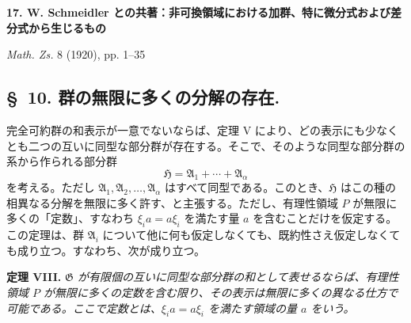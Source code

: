 
\begin{center}
{\Large\bfseries 17. W. Schmeidler との共著：非可換領域における加群、特に微分式および差分式から生じるもの}\par
\vspace{1em}
\emph{Math. Zs.} 8 (1920), pp. 1--35
\end{center}


\setcounter{footnote}{19}
\subsection*{\S~10. 群の無限に多くの分解の存在.}

完全可約群の和表示が一意でないならば、定理 V により、どの表示にも少なくとも二つの互いに同型な部分群が存在する。そこで、そのような同型な部分群の系から作られる部分群
\[
  \mathfrak H=\mathfrak A_1+\cdots+\mathfrak A_\alpha
\]
を考える。ただし $\mathfrak A_1,\mathfrak A_2,\ldots,\mathfrak A_\alpha$ はすべて同型である。このとき、$\mathfrak H$ はこの種の相異なる分解を無限に多く許す、と主張する。ただし、有理性領域 $P$ が無限に多くの「定数」、すなわち $\xi_i a=a\xi_i$ を満たす量 $a$ を含むことだけを仮定する。この定理は、群 $\mathfrak A_i$ について他に何も仮定しなくても、既約性さえ仮定しなくても成り立つ。すなわち、次が成り立つ。

\textbf{定理 VIII.} \emph{$\mathfrak G$ が有限個の互いに同型な部分群の和として表せるならば、有理性領域 $P$ が無限に多くの定数を含む限り、その表示は無限に多くの異なる仕方で可能である。ここで定数とは、$\xi_i a=a\xi_i$ を満たす領域の量 $a$ をいう。}

